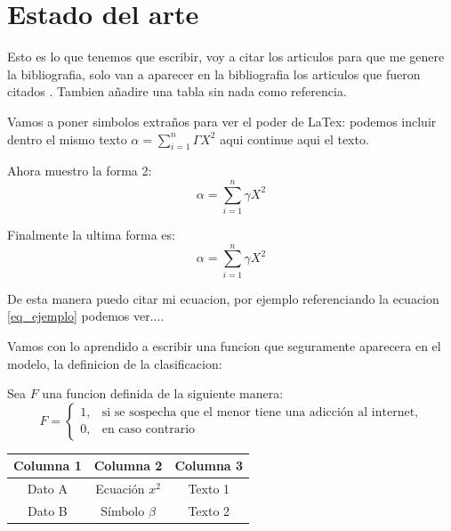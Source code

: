 \documentclass[10pt,letterpaper]{article}
\begin{document}
\newpage
\section{Estado del arte}
Esto es lo que tenemos que escribir, voy a citar los articulos para que me genere la bibliografia, solo van a aparecer en la bibliografia los articulos que fueron citados  \citep{lifestyle_changes, mobile_addiction, redes_sociales_gallegos, eficacia_academica, hurtado2024impactos}. Tambien añadire una tabla sin nada como referencia.

Vamos a poner simbolos extraños para ver el poder de LaTex: podemos incluir dentro el mismo texto $\alpha = \sum_{i=1}^n \Gamma X^2$ aqui continue aqui el texto.

\medskip   %
Ahora muestro la forma 2:
\[ \alpha = \sum_{i=1}^n \gamma X^2  \]

Finalmente la ultima forma es:
\begin{equation}
\alpha = \sum_{i=1}^n \gamma X^2
\label{eq_ejemplo}
\end{equation}

De esta manera puedo citar mi ecuacion, por ejemplo referenciando la ecuacion \eqref{eq_ejemplo} podemos ver....

Vamos con lo aprendido a escribir una funcion que seguramente aparecera en el modelo, la definicion de la clasificacion:

\bigskip
Sea $F$ una funcion definida de la siguiente manera:
\begin{equation}
F = 
\begin{cases} 
1, & \text{si se sospecha que el menor tiene una adicción al internet,} \\ 
0, & \text{en caso contrario} 
\end{cases}
\label{eq:funcion_binaria}
\end{equation}


\begin{table}[h]
\centering
\begin{tabular}{ccc}  %
\hline %
\textbf{Columna 1} & \textbf{Columna 2} & \textbf{Columna 3} \\
\hline
Dato A & Ecuación $x^2$ & Texto 1 \\  %
Dato B & Símbolo $\beta$ & Texto 2 \\
\hline
\end{tabular}
\end{table}
\end{document}
